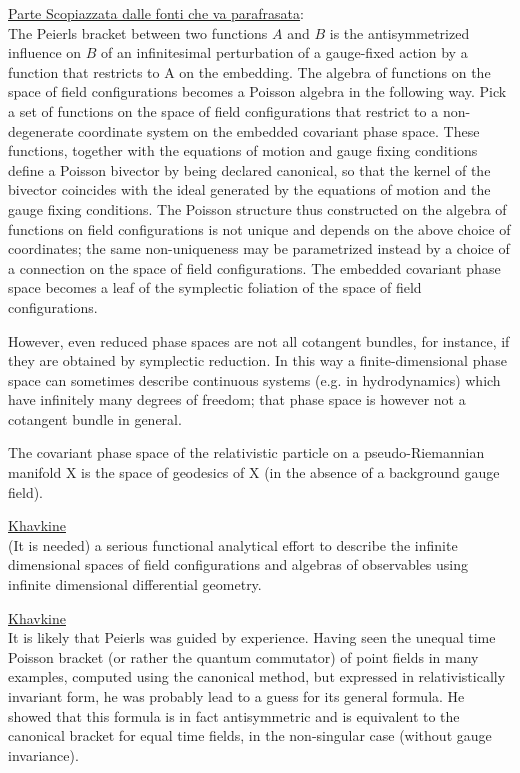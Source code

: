 \documentclass[Main]{subfiles}
\begin{document}
		\begin{Warning}
			\underline{Parte Scopiazzata dalle fonti che va parafrasata}:\\
			The Peierls bracket between two functions $A$ and $B$ is the antisymmetrized influence on $B$ of an infinitesimal perturbation of a gauge-fixed action by a function that restricts to A on the embedding. 
			The algebra of functions on the space of field configurations becomes a Poisson algebra in the following way. Pick a set of functions on the space of field configurations that restrict to a non-degenerate coordinate system on the embedded covariant phase space.
			These functions, together with the equations of motion and gauge fixing conditions define a Poisson bivector by being declared canonical, so that the kernel of the bivector coincides with the ideal generated by the equations of motion and the gauge fixing conditions.
			The Poisson structure thus constructed on the algebra of functions on field configurations is not unique and depends on the above choice of coordinates; the same non-uniqueness may be parametrized instead by a choice of a connection on the space of field configurations.
			The embedded covariant phase space becomes a leaf of the symplectic foliation of the space of field configurations.

			However, even reduced phase spaces are not all cotangent bundles, for instance, if they are obtained by symplectic reduction.
			In this way a finite-dimensional phase space can sometimes describe continuous systems (e.g. in hydrodynamics) which have infinitely many degrees of freedom; that phase space is however not a cotangent bundle in general.
		\end{Warning}

		\begin{example}
			The covariant phase space of the relativistic particle on a pseudo-Riemannian manifold X is the space of geodesics of X (in the absence of a background gauge field).
		\end{example}

		\begin{Warning}
			\underline{Khavkine}\cite{Khavkine2014}\\
			(It is needed) a serious functional analytical effort to describe the infinite dimensional spaces of field configurations and algebras of observables using infinite dimensional differential geometry.
		\end{Warning}				

		\begin{Warning}
			\underline{Khavkine}\cite{Khavkine2014}\\
			It is likely that Peierls was guided by experience. Having seen the unequal time Poisson bracket (or rather the quantum commutator) of point fields in many examples, computed using the canonical method, but expressed in relativistically invariant form, he was probably lead to a guess for its general formula. 
			He showed that this formula is in fact antisymmetric and is equivalent to the canonical bracket for equal time fields, in the non-singular case (without gauge invariance). 
		\end{Warning}		
	
\end{document}
